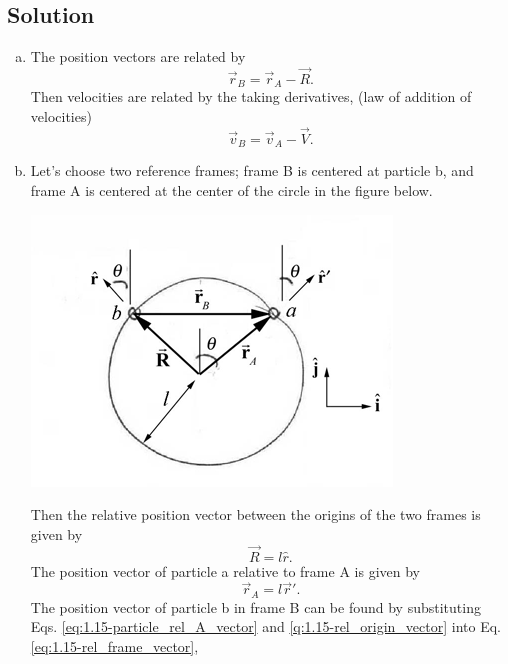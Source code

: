 \documentclass[solutions]{esg8012pset}
\begin{document}
\subsection{Solution}
  \begin{enumerate}[a.]
    \item The position vectors are related by
      \begin{equation} \vec r_B = \vec r_A - \vec R. \label{eq:1.15-rel_frame_vector}\end{equation}
      Then velocities are related by the taking derivatives, (law of addition of velocities)
      \begin{equation} \vec v_B = \vec v_A - \vec V. \label{eq:1.15-particle_A_vector}\end{equation} %
    \item Let's choose two reference frames; frame B is centered at particle b, and frame A is centered at the center of the circle in the figure below.
      \begin{center}\includegraphics{ps01_Solution_06_01}\end{center}
      Then the relative position vector between the origins of the two frames is given by
      \begin{equation} \vec R = l\hat r. \label{eq:1.15-rel_origin_vector}\end{equation}
      The position vector of particle a relative to frame A is given by
      \begin{equation} \vec r_A = l\vec r'. \label{eq:1.15-particle_rel_A_vector}\end{equation}
      The position vector of particle b in frame B can be found by substituting Eqs. \ref{eq:1.15-particle_rel_A_vector} and \ref{q:1.15-rel_origin_vector} into Eq. \ref{eq:1.15-rel_frame_vector},

\end{enumerate}
\end{document}
